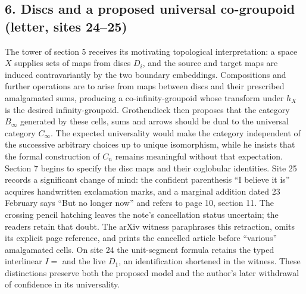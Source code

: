 \subsection*{6. Discs and a proposed universal co-groupoid (letter, sites 24--25)}
The tower of section 5 receives its motivating topological interpretation: a space $X$ supplies sets of maps from discs $D_i$, and the source and target maps are induced contravariantly by the two boundary embeddings. Compositions and further operations are to arise from maps between discs and their prescribed amalgamated sums, producing a co-infinity-groupoid whose transform under $h_X$ is the desired infinity-groupoid. Grothendieck then proposes that the category $B_\infty$ generated by these cells, sums and arrows should be dual to the universal category $C_\infty$. The expected universality would make the category independent of the successive arbitrary choices up to unique isomorphism, while he insists that the formal construction of $C_n$ remains meaningful without that expectation. Section 7 begins to specify the disc maps and their coglobular identities. Site 25 records a significant change of mind: the confident parenthesis ``I believe it is'' acquires handwritten exclamation marks, and a marginal addition dated 23 February says ``But no longer now'' and refers to page 10, section 11. The crossing pencil hatching leaves the note's cancellation status uncertain; the readers retain that doubt. The arXiv witness paraphrases this retraction, omits its explicit page reference, and prints the cancelled article before ``various'' amalgamated cells. On site 24 the unit-segment formula retains the typed interlinear $I=$ and the live $D_1$, an identification shortened in the witness. These distinctions preserve both the proposed model and the author's later withdrawal of confidence in its universality.

